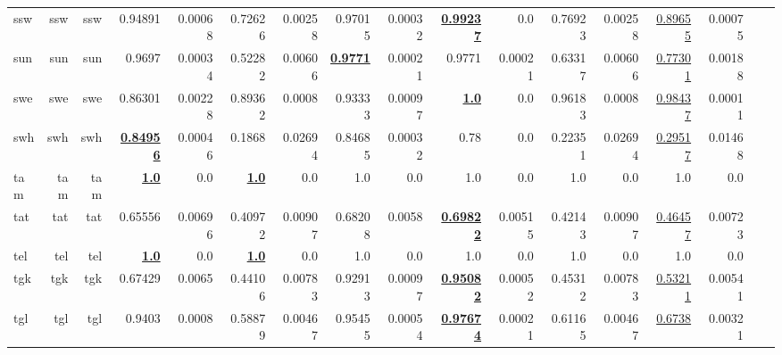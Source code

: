 \documentclass[11pt]{article}
\begin{document}
\begin{table*}[h]
{\begin{tabular}{lrrrrrrrrrrrrrrrr}
ssw         & ssw         & ssw         & 0.94891         & 0.00068         & 0.72626         & 0.00258         & 0.97015         & 0.00032         & \textbf{\underline{0.99237}}         & 0.0         & 0.76923         & 0.00258         & \underline{0.89655}         & 0.00075         \\
sun         & sun         & sun         & 0.9697         & 0.00034         & 0.52282         & 0.00606         & \textbf{\underline{0.9771}}         & 0.00021         & 0.9771         & 0.00021         & 0.63317         & 0.00606         & \underline{0.77301}         & 0.00188         \\
swe         & swe         & swe         & 0.86301         & 0.00228         & 0.89362         & 0.0008         & 0.93333         & 0.00097         & \textbf{\underline{1.0}}         & 0.0         & 0.96183         & 0.0008         & \underline{0.98437}         & 0.00011         \\
swh         & swh         & swh         & \textbf{\underline{0.84956}}         & 0.00046         & 0.1868         & 0.02694         & 0.84685         & 0.00032         & 0.78         & 0.0         & 0.22351         & 0.02694         & \underline{0.29517}         & 0.01468         \\
tam         & tam         & tam         & \textbf{\underline{1.0}}         & 0.0         & \textbf{\underline{1.0}}         & 0.0         & 1.0         & 0.0         & 1.0         & 0.0         & 1.0         & 0.0         & 1.0         & 0.0         \\
tat         & tat         & tat         & 0.65556         & 0.00696         & 0.40972         & 0.00907         & 0.68208         & 0.0058         & \textbf{\underline{0.69822}}         & 0.00515         & 0.42143         & 0.00907         & \underline{0.46457}         & 0.00723         \\
tel         & tel         & tel         & \textbf{\underline{1.0}}         & 0.0         & \textbf{\underline{1.0}}         & 0.0         & 1.0         & 0.0         & 1.0         & 0.0         & 1.0         & 0.0         & 1.0         & 0.0         \\
tgk         & tgk         & tgk         & 0.67429         & 0.0065         & 0.44106         & 0.00783         & 0.92913         & 0.00097         & \textbf{\underline{0.95082}}         & 0.00052         & 0.45312         & 0.00783         & \underline{0.53211}         & 0.00541         \\
tgl         & tgl         & tgl         & 0.9403         & 0.0008         & 0.58879         & 0.00467         & 0.95455         & 0.00054         & \textbf{\underline{0.97674}}         & 0.00021         & 0.61165         & 0.00467         & \underline{0.6738}         & 0.00321         \\

\end{tabular}}
\end{table*}
\end{document}
